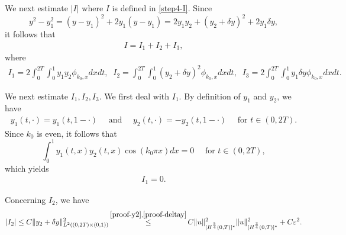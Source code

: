 \documentclass[11pt, reqno]{amsart}
\newcommand{\eps}{\varepsilon}
\theoremstyle{plain}
\numberwithin{equation}{section}
\begin{document}
     We next estimate $| I |$ where $I$ is defined in \eqref{step4-I}.    
Since
$$
y^2 - y_1^2 = \left(y - y_1\right)^2 + 2y_1 (y - y_1) = 2y_1 y_2  + \left(y_2 + \delta y \right)^2 +  2y_1 \delta y, 
$$
it follows that   
        \begin{align}
          I = I_1 + I_2 + I_3, \label{rewriteI}
        \end{align}             
        where
\begin{align*}
	I_1 = 2 \int_0^{2T} \int_0^1 y_1 y_2 \phi_{k_0, x} dx dt, \; \; I_2 = \int_0^{2T} \int_0^1 \left(y_2 + \delta y \right)^2 \phi_{k_0, x} dx dt,\; \;   I_3 = 2 \int_0^{2T} \int_0^1 y_1 \delta y \phi_{k_0, x} dx dt. 
\end{align*}  
      
We next estimate $I_1, I_2, I_3$. We first deal with $I_1$. By definition of $y_1$ and $y_2$, we have
        \begin{align}	
        y_1(t, \cdot) = y_1(t, 1 - \cdot)  \quad \mbox{ and } \quad y_2(t, \cdot) = - y_2 (t, 1- \cdot) \quad \mbox{ for } t \in (0, 2T).
        \end{align}
        Since $k_0$ is even, it follows that
        $$
        \int_0^1 y_1 (t, x) y_2(t, x) \cos (k_0 \pi x)  dx = 0 \quad \mbox{ for } t \in (0, 2T), 
        $$
which yields         
\begin{align}	\label{In2}
 I_1 = 0. 
        \end{align}        

Concerning $I_2$, we have
        \begin{align}   \label{In1}
           |I_2| \leq C \| y_2 + \delta y \|^2_{L^2((0, 2T)\times (0, 1))} 
            \mathop{\leq}^{ \eqref{proof-y2}, \eqref{proof-deltay}} C \|u \|_{[H^{\frac{5}{4}}(0, T)]^*}^2 \|u \|_{[H^{\frac{3}{4}}(0, T)]^*}^2 + C \varepsilon^2.
        \end{align}    
\end{document}
